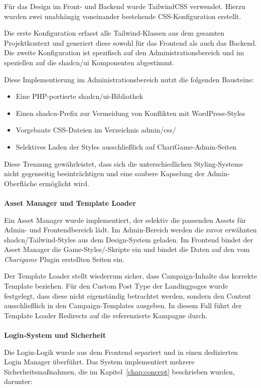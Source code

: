 Für das Design im Front- und Backend wurde TailwindCSS verwendet.
Hierzu wurden zwei unabhängig voneinander bestehende CSS-Konfiguration erstellt.

Die erste Konfiguration erfasst alle Tailwind-Klassen aus dem gesamten Projektkontext und generiert diese sowohl für das Frontend als auch das Backend.
Die zweite Konfiguration ist spezifisch auf den Administrationsbereich und im speziellen auf die shadcn/ui Komponenten abgestimmt.

Diese Implementierung im Administrationsbereich nutzt die folgenden Bausteine:
\begin{itemize}
\item Eine PHP-portierte shadcn/ui-Bibliothek
\item Einen shadcn-Prefix zur Vermeidung von Konflikten mit WordPress-Styles
\item Vorgebaute CSS-Dateien im Verzeichnis admin/css/
\item Selektives Laden der Styles ausschließlich auf ChariGame-Admin-Seiten
\end{itemize}
Diese Trennung gewährleistet, dass sich die unterschiedlichen Styling-Systeme nicht gegenseitig beeinträchtigen und eine saubere Kapselung der Admin-Oberfläche ermöglicht wird.
\\\\
\textbf{Asset Manager und Template Loader}

Ein Asset Manager wurde implementiert, der selektiv die passenden Assets für Admin- und Frontendbereich lädt.
Im Admin-Bereich werden die zuvor erwähnten shadcn/Tailwind-Styles aus dem Design-System geladen.
Im Frontend bindet der Asset Manager die Game-Styles/-Skripte ein und bindet die Daten auf den vom \textit{Charigame} Plugin erstellten Seiten ein.

Der Template Loader stellt wiederrum sicher, dass Campaign-Inhalte das korrekte Template beziehen.
Für den Custom Post Type der Landingpages wurde festgelegt, dass diese nicht eigenständig betrachtet werden, sondern den Content ausschließlich in den Campaign-Templates ausgeben.
In diesem Fall führt der Template Loader Redirects auf die referenzierte Kampagne durch.
\\\\
\textbf{Login-System und Sicherheit}

Die Login-Logik wurde aus dem Frontend separiert und in einen dedizierten Login Manager überführt.
Das System implementiert mehrere Sicherheitsmaßnahmen, die im Kapitel~\ref{chap:concept} beschrieben wurden, darunter:

